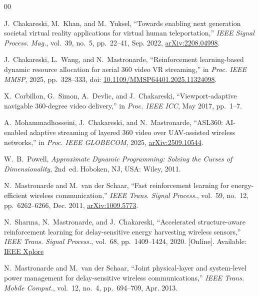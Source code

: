 \documentclass[conference]{IEEEtran}
\begin{document}
\begin{thebibliography}{00}

J.~Chakareski, M.~Khan, and M.~Yuksel, ``Towards enabling next generation societal virtual reality applications for virtual human teleportation,'' \emph{IEEE Signal Process. Mag.}, vol.~39, no.~5, pp.~22--41, Sep. 2022, \href{https://arxiv.org/abs/2208.04998}{arXiv:2208.04998}.

J.~Chakareski, L.~Wang, and N.~Mastronarde, ``Reinforcement learning-based dynamic resource allocation for aerial 360\textdegree{} video VR streaming,'' in \emph{Proc. IEEE MMSP}, 2025, pp.~328--333, doi: \href{https://doi.org/10.1109/MMSP64401.2025.11324098}{10.1109/MMSP64401.2025.11324098}.

X.~Corbillon, G.~Simon, A.~Devlic, and J.~Chakareski, ``Viewport-adaptive navigable 360-degree video delivery,'' in \emph{Proc. IEEE ICC}, May 2017, pp.~1--7.

A.~Mohammadhosseini, J.~Chakareski, and N.~Mastronarde, ``ASL360: AI-enabled adaptive streaming of layered 360\textdegree{} video over UAV-assisted wireless networks,'' in \emph{Proc. IEEE GLOBECOM}, 2025, \href{https://arxiv.org/abs/2509.10544}{arXiv:2509.10544}.

W.~B.~Powell, \emph{Approximate Dynamic Programming: Solving the Curses of Dimensionality}, 2nd~ed. Hoboken, NJ, USA: Wiley, 2011.

N.~Mastronarde and M.~van der Schaar, ``Fast reinforcement learning for energy-efficient wireless communication,'' \emph{IEEE Trans. Signal Process.}, vol.~59, no.~12, pp.~6262--6266, Dec. 2011, \href{https://arxiv.org/abs/1009.5773}{arXiv:1009.5773}.

N.~Sharma, N.~Mastronarde, and J.~Chakareski, ``Accelerated structure-aware reinforcement learning for delay-sensitive energy harvesting wireless sensors,'' \emph{IEEE Trans. Signal Process.}, vol.~68, pp.~1409--1424, 2020. [Online]. Available: \href{https://ieeexplore.ieee.org/document/8998306}{IEEE Xplore}

N.~Mastronarde and M.~van der Schaar, ``Joint physical-layer and system-level power management for delay-sensitive wireless communications,'' \emph{IEEE Trans. Mobile Comput.}, vol.~12, no.~4, pp.~694--709, Apr. 2013.


\end{thebibliography}
\end{document}
